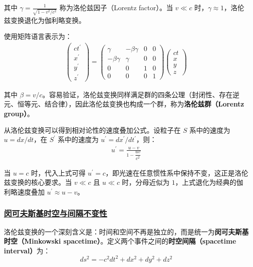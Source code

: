 其中 $\gamma = \displaystyle\frac{1}{\sqrt{1 - v^2/c^2}}$ 称为洛伦兹因子（Lorentz factor）。当 $v \ll c$ 时，$\gamma \approx 1$，洛伦兹变换退化为伽利略变换。

使用矩阵语言表示为：
\begin{align*}
    \begin{pmatrix}
        ct^\prime\\x^\prime\\y^\prime\\z^\prime
    \end{pmatrix}
    =
    \begin{pmatrix}
        \gamma & -\beta\gamma & 0 & 0\\
        -\beta\gamma & \gamma & 0 & 0\\
        0 & 0 & 1 & 0\\
        0 & 0 & 0 & 1
    \end{pmatrix}
    \begin{pmatrix}
        ct\\x\\y\\z
    \end{pmatrix}
\end{align*}

其中 $\beta = v/c$。容易验证，洛伦兹变换同样满足群的四条公理（封闭性、存在逆元、恒等元、结合律），因此洛伦兹变换也构成一个群，称为\textbf{洛伦兹群（Lorentz group）}。

从洛伦兹变换可以得到相对论性的速度叠加公式。设粒子在 $S$ 系中的速度为 $u = dx/dt$，在 $S^\prime$ 系中的速度为 $u^\prime = dx^\prime/dt^\prime$，则：
\begin{align*}
    u^\prime = \frac{u - v}{1 - \dfrac{uv}{c^2}}
\end{align*}

当 $u = c$ 时，代入上式可得 $u^\prime = c$，即光速在任意惯性系中保持不变，这正是洛伦兹变换的核心要求。当 $v \ll c$ 且 $u \ll c$ 时，分母近似为 $1$，上式退化为经典的伽利略速度叠加 $u^\prime \approx u - v$。

\subsubsection{\protect\hyperlink{:}{闵可夫斯基时空与间隔不变性}}

洛伦兹变换的一个深刻含义是：时间和空间不再是独立的，而是统一为\textbf{闵可夫斯基时空（Minkowski spacetime）}。定义两个事件之间的\textbf{时空间隔（spacetime interval）}为：
\begin{equation*}
    ds^2 = -c^2 dt^2 + dx^2 + dy^2 + dz^2
\end{equation*}

